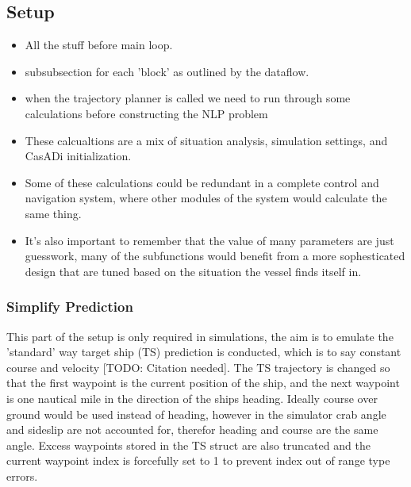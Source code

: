 \subsection{Setup}
\begin{itemize}
    \item All the stuff before main loop.
    \item subsubsection for each 'block' as outlined by the dataflow.
\end{itemize}

\begin{itemize}
    \item when the trajectory planner is called we need to run through some calculations before constructing the NLP problem
    \item These calcualtions are a mix of situation analysis, simulation settings, and CasADi initialization.
    \item Some of these calculations could be redundant in a complete control and navigation system,
    where other modules of the system would calculate the same thing.
    \item It's also important to remember that the value of many parameters are just guesswork, many of the subfunctions
    would benefit from a more sophesticated design that are tuned based on the situation the vessel finds itself in.
\end{itemize}

\subsubsection{Simplify Prediction}
This part of the setup is only required in simulations, the aim is to emulate the 'standard' way target ship (TS) prediction is conducted,
which is to say constant course and velocity [TODO: Citation needed]. The TS trajectory is changed so that the first waypoint is the current position of the
ship, and the next waypoint is one nautical mile in the direction of the ships heading. Ideally course over ground would be used instead of heading, however
in the simulator crab angle and sideslip are not accounted for, therefor heading and course are the same angle.
Excess waypoints stored in the TS struct are also truncated and the current waypoint index is forcefully set to 1 to prevent index out of range type errors.


